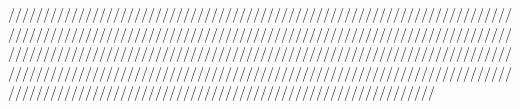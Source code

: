 \documentclass{article}
\begin{document}
\begin{Maple Normal}

\end{Maple Normal}
\begin{Maple Normal}
/////////////////////////////////////////////////////////////////////////////////////////////////////////////////////////////////////////////////////////////////////////////////////////////////////////////////////////////////////////////////////////////////////////////////////////////////////////////////////////////////////////////////////////////
\end{Maple Normal}
\begin{Maple Normal}

\end{Maple Normal}
\end{document}
